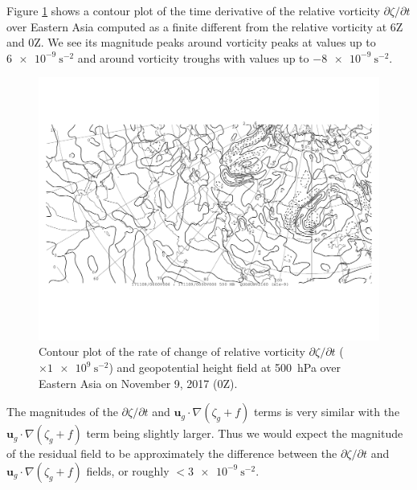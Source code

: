 \documentclass[11pt]{article}
\begin{document}
Figure \ref{fig:dvordt_500hPa_China} shows a contour plot of the time derivative of the relative vorticity $\partial\zeta/\partial t$ over Eastern Asia computed as a finite different from the relative vorticity at 6Z and 0Z. We see its magnitude peaks around vorticity peaks at values up to $\SI{6e-9}{\s^{-2}}$ and around vorticity troughs with values up to $\SI{-8e-9}{\s^{-2}}$.

\begin{figure}[h!]
	\centering
	\includegraphics[width=\textwidth]{dvordt_500hPa_China}
	\caption{Contour plot of the rate of change of relative vorticity $\partial\zeta/\partial t$ ($\times \SI{1e9}{\s^{-2}}$) and geopotential height field at \SI{500}{\hecto\Pa} over Eastern Asia on November 9, 2017 (0Z).}
	\label{fig:dvordt_500hPa_China}
\end{figure}

The magnitudes of the $\partial\zeta/\partial t$ and $\bm{u}_g \cdot \nabla(\zeta_g + f)$ terms is very similar with the $\bm{u}_g \cdot \nabla(\zeta_g + f)$ term being slightly larger. Thus we would expect the magnitude of the residual field to be approximately the difference between the $\partial\zeta/\partial t$ and $\bm{u}_g \cdot \nabla(\zeta_g + f)$ fields, or roughly $<\SI{3e-9}{\s^{-2}}$.


\end{document}
